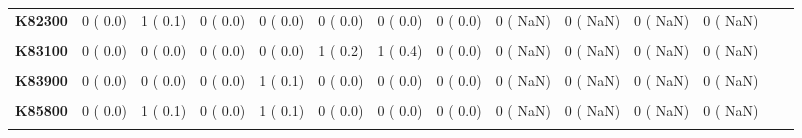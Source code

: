 \documentclass[
]{article}
\begin{document}
\begin{table}[H]
\begin{tabular}[t]{>{\raggedright\arraybackslash}p{5em}ccccccccccccc}
\textbf{K82300} & 0 (  0.0) & 1 (  0.1) & 0 (  0.0) & 0 (  0.0) & 0 (  0.0) & 0 (  0.0) & 0 (  0.0) & 0 (  NaN) & 0 (  NaN) & 0 (  NaN) & 0 (  NaN) &  & \\
\textbf{\cellcolor{gray!10}{K83000}} & \cellcolor{gray!10}{1 (  0.1)} & \cellcolor{gray!10}{0 (  0.0)} & \cellcolor{gray!10}{0 (  0.0)} & \cellcolor{gray!10}{1 (  0.1)} & \cellcolor{gray!10}{0 (  0.0)} & \cellcolor{gray!10}{0 (  0.0)} & \cellcolor{gray!10}{1 (  0.4)} & \cellcolor{gray!10}{0 (  NaN)} & \cellcolor{gray!10}{0 (  NaN)} & \cellcolor{gray!10}{0 (  NaN)} & \cellcolor{gray!10}{0 (  NaN)} & \cellcolor{gray!10}{} & \cellcolor{gray!10}{}\\
\textbf{K83100} & 0 (  0.0) & 0 (  0.0) & 0 (  0.0) & 0 (  0.0) & 1 (  0.2) & 1 (  0.4) & 0 (  0.0) & 0 (  NaN) & 0 (  NaN) & 0 (  NaN) & 0 (  NaN) &  & \\
\textbf{\cellcolor{gray!10}{K83800}} & \cellcolor{gray!10}{0 (  0.0)} & \cellcolor{gray!10}{1 (  0.1)} & \cellcolor{gray!10}{0 (  0.0)} & \cellcolor{gray!10}{0 (  0.0)} & \cellcolor{gray!10}{1 (  0.2)} & \cellcolor{gray!10}{0 (  0.0)} & \cellcolor{gray!10}{0 (  0.0)} & \cellcolor{gray!10}{0 (  NaN)} & \cellcolor{gray!10}{0 (  NaN)} & \cellcolor{gray!10}{0 (  NaN)} & \cellcolor{gray!10}{0 (  NaN)} & \cellcolor{gray!10}{} & \cellcolor{gray!10}{}\\
\textbf{K83900} & 0 (  0.0) & 0 (  0.0) & 0 (  0.0) & 1 (  0.1) & 0 (  0.0) & 0 (  0.0) & 0 (  0.0) & 0 (  NaN) & 0 (  NaN) & 0 (  NaN) & 0 (  NaN) &  & \\
\textbf{\cellcolor{gray!10}{K85000}} & \cellcolor{gray!10}{2 (  0.2)} & \cellcolor{gray!10}{0 (  0.0)} & \cellcolor{gray!10}{0 (  0.0)} & \cellcolor{gray!10}{0 (  0.0)} & \cellcolor{gray!10}{0 (  0.0)} & \cellcolor{gray!10}{0 (  0.0)} & \cellcolor{gray!10}{0 (  0.0)} & \cellcolor{gray!10}{0 (  NaN)} & \cellcolor{gray!10}{0 (  NaN)} & \cellcolor{gray!10}{0 (  NaN)} & \cellcolor{gray!10}{0 (  NaN)} & \cellcolor{gray!10}{} & \cellcolor{gray!10}{}\\
\textbf{K85800} & 0 (  0.0) & 1 (  0.1) & 0 (  0.0) & 1 (  0.1) & 0 (  0.0) & 0 (  0.0) & 0 (  0.0) & 0 (  NaN) & 0 (  NaN) & 0 (  NaN) & 0 (  NaN) &  & \\
\textbf{\cellcolor{gray!10}{K85900}} & \cellcolor{gray!10}{0 (  0.0)} & \cellcolor{gray!10}{0 (  0.0)} & \cellcolor{gray!10}{2 (  0.2)} & \cellcolor{gray!10}{1 (  0.1)} & \cellcolor{gray!10}{0 (  0.0)} & \cellcolor{gray!10}{0 (  0.0)} & \cellcolor{gray!10}{0 (  0.0)} & \cellcolor{gray!10}{0 (  NaN)} & \cellcolor{gray!10}{0 (  NaN)} & \cellcolor{gray!10}{0 (  NaN)} & \cellcolor{gray!10}{0 (  NaN)} & \cellcolor{gray!10}{} & \cellcolor{gray!10}{}\\

\end{tabular}
\end{table}
\end{document}
